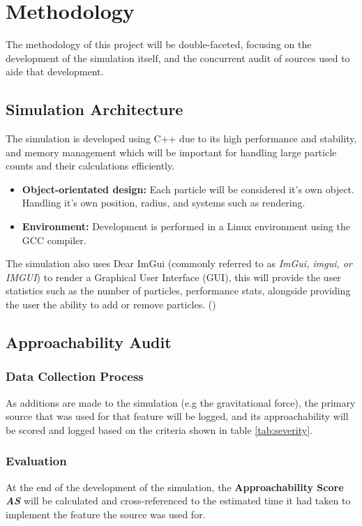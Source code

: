 \chapter{Methodology}

The methodology of this project will be double-faceted, focusing on the development of the simulation itself, and the concurrent audit of
sources used to aide that development.

\section{Simulation Architecture}

The simulation is developed using C++ due to its high performance and stability, and memory management
which will be important for handling large particle counts and their calculations efficiently.

\begin{itemize}
    \item \textbf{Object-orientated design:} Each particle will be considered it's own object. Handling it's own position, radius, and systems such as rendering.
    \item \textbf{Environment:} Development is performed in a Linux environment using the GCC compiler.
\end{itemize}

The simulation also uses Dear ImGui (commonly referred to as \textit{ImGui, imgui, or IMGUI}) to render a Graphical User Interface (GUI), this will provide the user statistics such as the number of particles, performance stats, alongside providing the user the ability to add or remove particles. (\cite{ocornut-imgui})

\section{Approachability Audit}
\subsection{Data Collection Process}

As additions are made to the simulation (e.g the gravitational force), the primary source that was used for that feature will be logged, and its approachability will be scored and logged based on the criteria shown in table \ref{tab:severity}.

\subsection{Evaluation}
At the end of the development of the simulation, the \textbf{Approachability Score \textit{AS}} will be calculated and cross-referenced to the estimated time it had taken to implement the feature the source was used for.

